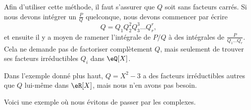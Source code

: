 \begin{remark}
	Afin d'utiliser cette méthode, il faut s'assurer que \( Q\) soit sans facteurs carrés. Si nous devons intégrer un \( \frac{ P }{ Q }\) quelconque, nous devons commencer par écrire
	\begin{equation}
		Q=Q_1Q_2^2Q_3^3\ldots Q_r^r,
	\end{equation}
	et ensuite il y a moyen de ramener l'intégrale de \( P/Q\) à des intégrales de \( \frac{ P }{ Q_1\ldots Q_r }\). Cela ne demande pas de factoriser complètement \( Q\), mais seulement de trouver ses facteurs irréductibles \( Q_i\) dans \( \eQ[X]\).

	Dans l'exemple donné plus haut, \( Q=X^2-3\) a des facteurs irréductibles autres que \( Q\) lui-même dans \( \eR[X]\), mais nous n'en avons pas besoin.
\end{remark}

Voici une exemple où nous évitons de passer par les complexes.


